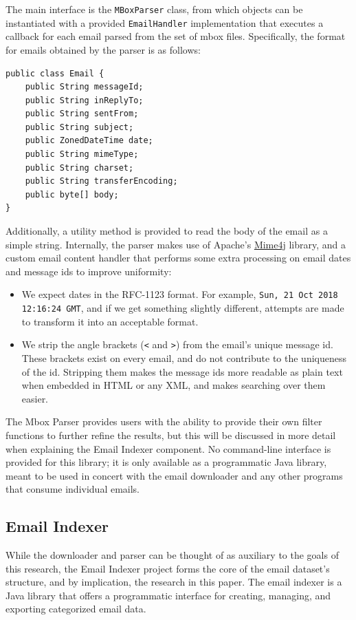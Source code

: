 \documentclass[a4paper, 12pt]{article}
\begin{document}
		The main interface is the \texttt{MBoxParser} class, from which objects can be instantiated with a provided \texttt{EmailHandler} implementation that executes a callback for each email parsed from the set of mbox files. Specifically, the format for emails obtained by the parser is as follows:
		
		\begin{verbatim}
public class Email {
	public String messageId;
	public String inReplyTo;
	public String sentFrom;
	public String subject;
	public ZonedDateTime date;
	public String mimeType;
	public String charset;
	public String transferEncoding;
	public byte[] body;
}
		\end{verbatim}
	
		Additionally, a utility method is provided to read the body of the email as a simple string. Internally, the parser makes use of Apache's \href{https://james.apache.org/mime4j/}{Mime4j} library, and a custom email content handler that performs some extra processing on email dates and message ids to improve uniformity:
		
		\begin{itemize}
			\item We expect dates in the RFC-1123 format. For example, \texttt{Sun, 21 Oct 2018 12:16:24 GMT}, and if we get something slightly different, attempts are made to transform it into an acceptable format.
			\item We strip the angle brackets (\texttt{<} and \texttt{>}) from the email's unique message id. These brackets exist on every email, and do not contribute to the uniqueness of the id. Stripping them makes the message ids more readable as plain text when embedded in HTML or any XML, and makes searching over them easier.
		\end{itemize}

		The Mbox Parser provides users with the ability to provide their own filter functions to further refine the results, but this will be discussed in more detail when explaining the Email Indexer component. No command-line interface is provided for this library; it is only available as a programmatic Java library, meant to be used in concert with the email downloader and any other programs that consume individual emails.
	
	\newpage
	\subsection{Email Indexer}
		\label{sec:email-indexer}
		While the downloader and parser can be thought of as auxiliary to the goals of this research, the Email Indexer project forms the core of the email dataset's structure, and by implication, the research in this paper. The email indexer is a Java library that offers a programmatic interface for creating, managing, and exporting categorized email data.
		
\end{document}
